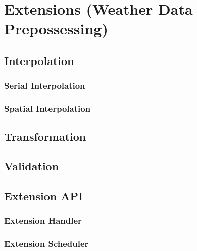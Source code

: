 \section{Extensions (Weather Data Prepossessing)}

\subsection{Interpolation}

\subsubsection{Serial Interpolation}

\subsubsection{Spatial Interpolation}

\subsection{Transformation}

\subsection{Validation}

\subsection{Extension API}

\subsubsection{Extension Handler}

\subsubsection{Extension Scheduler}
